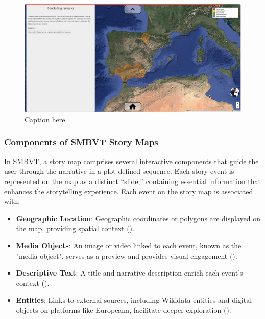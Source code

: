 \begin{figure}[h!tb]
\begin{multicols}{2}
    \includegraphics[width=\linewidth]{img/charcoal4.png}
    \caption{Caption here}\label{fig:charcoal4}\par
\end{multicols}
\end{figure}

\subsubsection{Components of SMBVT Story Maps}
In SMBVT, a story map comprises several interactive components that guide the user through the narrative in a plot-defined sequence. Each story event is represented on the map as a distinct “slide,” containing essential information that enhances the storytelling experience. Each event on the story map is associated with:

\begin{itemize}
    \item \textbf{Geographic Location}: Geographic coordinates or polygons are displayed on the map, providing spatial context ().
    \item \textbf{Media Objects}: An image or video linked to each event, known as the "media object", serves as a preview and provides visual engagement ().
    \item \textbf{Descriptive Text}: A title and narrative description enrich each event’s context ().
    \item \textbf{Entities}: Links to external sources, including Wikidata entities and digital objects on platforms like Europeana, facilitate deeper exploration ().
\end{itemize}

